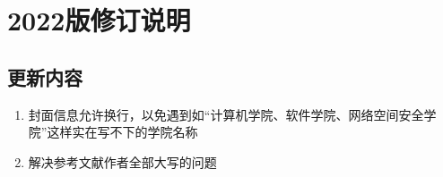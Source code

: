\section{2022版修订说明}

\subsection{更新内容}

\begin{enumerate}[1、]
    \item 封面信息允许换行，以免遇到如“计算机学院、软件学院、网络空间安全学院”这样实在写不下的学院名称
    \item 解决参考文献作者全部大写的问题
\end{enumerate}
